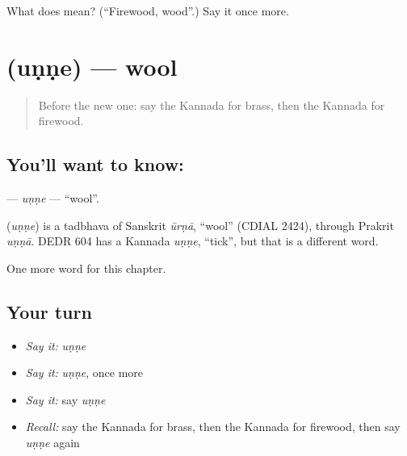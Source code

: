 \begin{tcolorbox}[breakable,colback=teal!4,colframe=teal!35!black,title={Before you move on}]
What does  mean? (\textquotedblleft{}Firewood, wood\textquotedblright{}.) Say it once more.
\end{tcolorbox}
\section[\texorpdfstring{\kn{ಉಣ್ಣೆ} (uṇṇe)}{ಉಣ್ಣೆ (uṇṇe)}]{ (uṇṇe) — wool}

\label{lesson:KA-C302-unne}



\begin{quote}
Before the new one: say the Kannada for brass, then the Kannada for firewood.
\end{quote}

\subsection*{You'll want to know: }
\textbf{} — \emph{uṇṇe} — \textquotedblleft{}wool\textquotedblright{}.

\begin{cousinweb}
\textbf{} (\emph{uṇṇe}) is a tadbhava of Sanskrit \emph{ūrṇā}, \textquotedblleft{}wool\textquotedblright{} (CDIAL 2424), through Prakrit \emph{uṇṇā}. DEDR 604 has a Kannada \emph{uṇṇe}, \textquotedblleft{}tick\textquotedblright{}, but that is a different word.
\end{cousinweb}

\begin{grammarlens}[title={What you've built}]
One more word for this chapter.
\end{grammarlens}

\subsection*{Your turn}
\begin{itemize}
\raggedright
  \item \emph{Say it:} \emph{uṇṇe}
  \item \emph{Say it:} \emph{uṇṇe}, once more
  \item \emph{Say it:} say \emph{uṇṇe}
  \item \emph{Recall:} say the Kannada for brass, then the Kannada for firewood, then say \emph{uṇṇe} again
\end{itemize}

